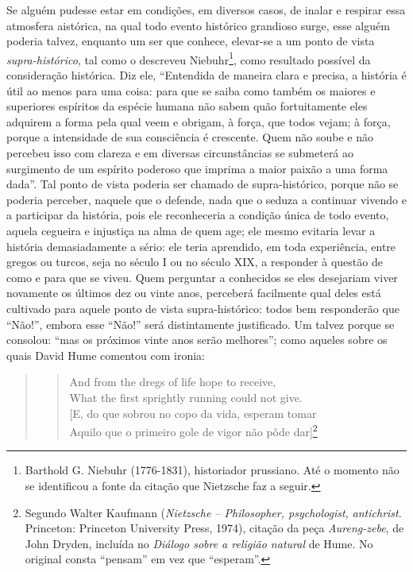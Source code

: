 Se alguém pudesse estar em condições, em diversos casos, de inalar e
respirar essa atmosfera aistórica, na qual todo evento histórico
grandioso surge, esse alguém poderia talvez, enquanto um ser que
conhece, elevar-se a um ponto de vista \emph{supra-histórico}, tal como
o descreveu Niebuhr\footnote{Barthold G. Niebuhr (1776-1831),
  historiador prussiano. Até o momento não se identificou a fonte da
  citação que Nietzsche faz a seguir.}, como resultado possível da
consideração histórica. Diz ele, ``Entendida de maneira clara e precisa,
a história é útil ao menos para uma coisa: para que se saiba como também
os maiores e superiores espíritos da espécie humana não sabem quão
fortuitamente eles adquirem a forma pela qual veem e obrigam, à força,
que todos vejam; à força, porque a intensidade de sua consciência é
crescente. Quem não soube e não percebeu isso com clareza e em diversas
circunstâncias se submeterá ao surgimento de um espírito poderoso que
imprima a maior paixão a uma forma dada''. Tal ponto de vista poderia
ser chamado de supra-histórico, porque não se poderia perceber, naquele
que o defende, nada que o seduza a continuar vivendo e a participar da
história, pois ele reconheceria a condição única de todo evento, aquela
cegueira e injustiça na alma de quem age; ele mesmo evitaria levar a
história demasiadamente a sério: ele teria aprendido, em toda
experiência, entre gregos ou turcos, seja no século I ou no século XIX,
a responder à questão de como e para que se viveu. Quem perguntar a
conhecidos se eles desejariam viver novamente os últimos dez ou vinte
anos, perceberá facilmente qual deles está cultivado para aquele ponto
de vista supra-histórico: todos bem responderão que ``Não!'', embora
esse ``Não!'' será distintamente justificado. Um talvez porque se
consolou: ``mas os próximos vinte anos serão melhores''; como aqueles
sobre os quais David Hume comentou com ironia:

\begin{quote}
\begin{verse}
And from the dregs of life hope to receive,\\
What the first sprightly running could not give.\\
{[}E, do que sobrou no copo da vida, esperam tomar\\
Aquilo que o primeiro gole de vigor não pôde dar{]}\footnote{Segundo
  Walter Kaufmann (\emph{Nietzsche -- Philosopher, psychologist,}
  \emph{antichrist}. Princeton: Princeton University Press, 1974),
  citação da peça \emph{Aureng-zebe}, de John Dryden, incluída no
  \emph{Diálogo sobre a religião natural} de Hume. No original consta
  ``pensam'' em vez que ``esperam''.}
\end{verse}
\end{quote}

